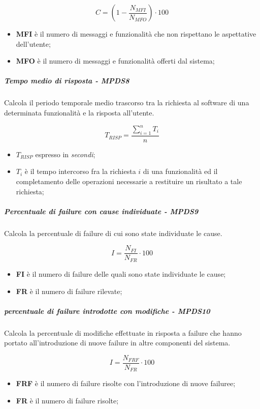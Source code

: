 \begin{equation*}C=(1-\frac{N_{MFI}}{N_{MFO}}) \cdot 100\end{equation*}
\begin{itemize}
	\item \textbf{MFI} è il numero di messaggi e funzionalità che non rispettano le aspettative dell'utente;
	\item \textbf{MFO} è il numero di messaggi e funzionalità offerti dal sistema;
\end{itemize}
\subparagraph{Tempo medio di risposta - MPDS8}
Calcola il periodo temporale medio trascorso tra la richiesta al software di una determinata funzionalità e la risposta all’utente.

\begin{equation*}T_{RISP} = \frac{\sum_{i=1}^{n} T_{i}}{n}\end{equation*}
\begin{itemize}
	\item \textbf{$T_{RISP}$} espresso in \textit{secondi};
	\item \textbf{$T_{i}$} è il tempo intercorso fra la richiesta $i$ di una funzionalità ed il completamento delle operazioni necessarie a restituire un risultato a tale richiesta;
\end{itemize}
\subparagraph{Percentuale di failure con cause individuate - MPDS9}
Calcola la percentuale di failure di cui sono state individuate le cause.

\begin{equation*}I=\frac{N_{FI}}{N_{FR}} \cdot 100 \end{equation*}
\begin{itemize}
	\item \textbf{FI}  è il numero di failure delle quali sono state individuate le cause;
	\item \textbf{FR} è il numero di failure rilevate;
\end{itemize}
\subparagraph{percentuale di failure introdotte con modifiche - MPDS10}
Calcola la percentuale di modifiche effettuate in risposta a failure che hanno portato all'introduzione di nuove failure in altre componenti del sistema.

\begin{equation*}I=\frac{N_{FRF}}{N_{FR}} \cdot 100 \end{equation*}
\begin{itemize}
	\item \textbf{FRF}  è il numero di failure risolte con l'introduzione di nuove failuree;
	\item \textbf{FR} è il numero di failure risolte;
\end{itemize}

